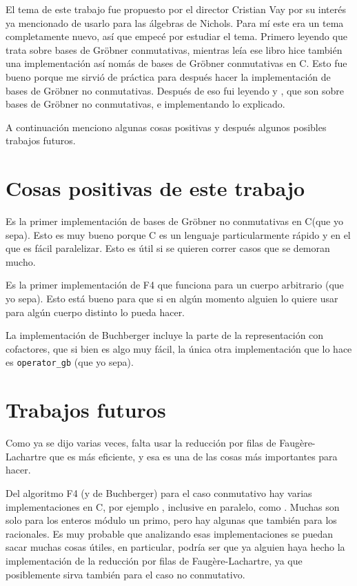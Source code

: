 \documentclass[12pt]{report}
\theoremstyle{customstyle}
\theoremstyle{factstyle}
\newcommand\cpp{C\nolinebreak[4]\hspace{-.05em}\raisebox{.4ex}{\relsize{-3}{\textbf{++}}}\xspace}
\begin{document}
El tema de este trabajo fue propuesto por el director Cristian Vay por su interés ya mencionado de usarlo para las álgebras de Nichols. Para mí este era un tema completamente nuevo, así que empecé por estudiar el tema. Primero leyendo \cite{book:ideals-varieties-algorithms} que trata sobre bases de Gröbner conmutativas, mientras leía ese libro hice también una implementación así nomás de bases de Gröbner conmutativas en \cpp. Esto fue bueno porque me sirvió de práctica para después hacer la implementación de bases de Gröbner no conmutativas. Después de eso fui leyendo \cite{thesis:Hof20} y \cite{phdthesis:Hof23}, que son sobre bases de Gröbner no conmutativas, e implementando lo explicado.

A continuación menciono algunas cosas positivas y después algunos posibles trabajos futuros.

\section{Cosas positivas de este trabajo}

Es la primer implementación de bases de Gröbner no conmutativas en \cpp (que yo sepa). Esto es muy bueno porque \cpp es un lenguaje particularmente rápido y en el que es fácil paralelizar. Esto es útil si se quieren correr casos que se demoran mucho.

Es la primer implementación de F4 que funciona para un cuerpo arbitrario (que yo sepa). Esto está bueno para que si en algún momento alguien lo quiere usar para algún cuerpo distinto lo pueda hacer.

La implementación de Buchberger incluye la parte de la representación con cofactores, que si bien es algo muy fácil, la única otra implementación que lo hace es \texttt{operator\_gb} (que yo sepa).

\section{Trabajos futuros}\label{section:trabajos futuros}

Como ya se dijo varias veces, falta usar la reducción por filas de Faugère-Lachartre que es más eficiente, y esa es una de las cosas más importantes para hacer.

Del algoritmo F4 (y de Buchberger) para el caso conmutativo hay varias implementaciones en \cpp, por ejemplo \cite{lib:openf4, lib:mathic, lib:M4GB}, inclusive en paralelo, como \cite{DBLP:journals/jsc/Reeves98, lib:parallelGBC}. Muchas son solo para los enteros módulo un primo, pero hay algunas que también para los racionales. Es muy probable que analizando esas implementaciones se puedan sacar muchas cosas útiles, en particular, podría ser que ya alguien haya hecho la implementación de la reducción por filas de Faugère-Lachartre, ya que posiblemente sirva también para el caso no conmutativo.
\end{document}
